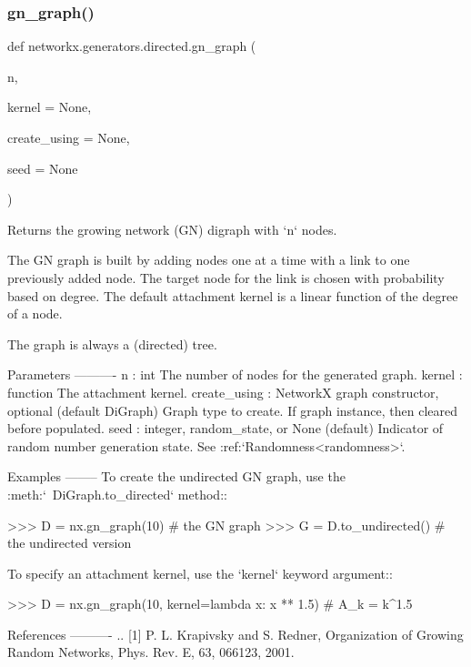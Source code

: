\subsubsection{\texorpdfstring{gn\+\_\+graph()}{gn\_graph()}}
{\footnotesize\ttfamily def networkx.\+generators.\+directed.\+gn\+\_\+graph (\begin{DoxyParamCaption}\item[{}]{n,  }\item[{}]{kernel = {\ttfamily None},  }\item[{}]{create\+\_\+using = {\ttfamily None},  }\item[{}]{seed = {\ttfamily None} }\end{DoxyParamCaption})}

\begin{DoxyVerb}Returns the growing network (GN) digraph with `n` nodes.

The GN graph is built by adding nodes one at a time with a link to one
previously added node.  The target node for the link is chosen with
probability based on degree.  The default attachment kernel is a linear
function of the degree of a node.

The graph is always a (directed) tree.

Parameters
----------
n : int
    The number of nodes for the generated graph.
kernel : function
    The attachment kernel.
create_using : NetworkX graph constructor, optional (default DiGraph)
    Graph type to create. If graph instance, then cleared before populated.
seed : integer, random_state, or None (default)
    Indicator of random number generation state.
    See :ref:`Randomness<randomness>`.

Examples
--------
To create the undirected GN graph, use the :meth:`~DiGraph.to_directed`
method::

>>> D = nx.gn_graph(10)  # the GN graph
>>> G = D.to_undirected()  # the undirected version

To specify an attachment kernel, use the `kernel` keyword argument::

>>> D = nx.gn_graph(10, kernel=lambda x: x ** 1.5)  # A_k = k^1.5

References
----------
.. [1] P. L. Krapivsky and S. Redner,
       Organization of Growing Random Networks,
       Phys. Rev. E, 63, 066123, 2001.
\end{DoxyVerb}
 \mbox{\label{namespacenetworkx_1_1generators_1_1directed_a215b5547a0c19ece134e9a00b1ff7932}} 

